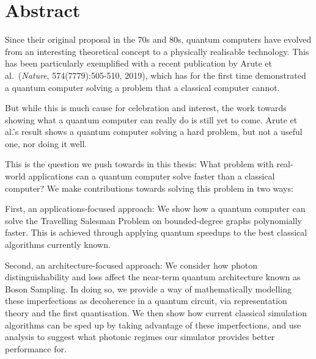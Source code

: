 \chapter*{Abstract}

Since their original proposal in the 70s and 80s, quantum computers have evolved from an interesting theoretical concept to a physically realisable technology. This has been particularly exemplified with a recent publication by Arute et al.~(\emph{Nature}, 574(7779):505-510, 2019), which has for the first time demonstrated a quantum computer solving a problem that a classical computer cannot.

But while this is much cause for celebration and interest, the work towards showing what a quantum computer can really do is still yet to come. Arute et al.'s result shows a quantum computer solving a hard problem, but not a useful one, nor doing it well.

This is the question we push towards in this thesis: What problem with real-world applications can a quantum computer solve faster than a classical computer? We make contributions towards solving this problem in two ways:

First, an applications-focused approach: We show how a quantum computer can solve the Travelling Salesman Problem on bounded-degree graphs polynomially faster. This is achieved through applying quantum speedups to the best classical algorithms currently known.

Second, an architecture-focused approach: We consider how photon distinguishability and loss affect the near-term quantum architecture known as Boson Sampling. In doing so, we provide a way of mathematically modelling these imperfections as decoherence in a quantum circuit, via representation theory and the first quantisation. We then show how current classical simulation algorithms can be sped up by taking advantage of these imperfections, and use analysis to suggest what photonic regimes our simulator provides better performance for.
